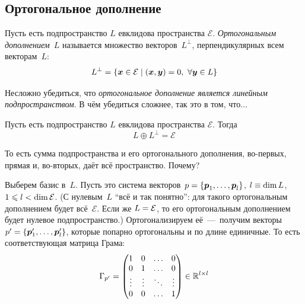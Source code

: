 \documentclass[a4paper,12pt]{article}
\begin{document}
  
  \subsection{Ортогональное дополнение}
  
  \begin{definition}
    Пусть есть подпространство $L$ евклидова пространства $\mathcal E$.
    \emph{Ортогональным дополнением}~$L$ называется множество векторов~$L^{\perp}$, перпендикулярных всем векторам~$L$:
    \[
      L^{\perp} = \{\boldsymbol x \in \mathcal E \mid (\boldsymbol x, \boldsymbol y) = 0,\ \forall \boldsymbol y \in L\}
    \]
  \end{definition}
  
  Несложно убедиться, что \emph{ортогональное дополнение является линейным подпространством}.
  В чём убедиться сложнее, так это в том, что...
  
  \begin{proposition}
    Пусть есть подпространство $L$ евклидова пространства $\mathcal E$.
    Тогда
    \[
      L \oplus L^{\perp} = \mathcal E
    \]
  \end{proposition}
  
  То есть сумма подпространства и его ортогонального дополнения, во-первых, прямая и, во-вторых, даёт всё пространство.
  Почему?
  
  Выберем базис в~$L$.
  Пусть это система векторов~$p \hm= \{\bds p_1, \ldots, \bds p_l\}$, $l \hm\equiv \dim L$, $1 \hm\leq l \hm< \dim \mathcal E$.
  (С нулевым~$L$ ``всё и так понятно'': для такого ортогональным дополнением будет всё~$\mathcal E$.
  Если же $L \hm= \mathcal E$, то его ортогональным дополнением будет нулевое подпространство.)
  Ортогонализируем её~---~получим векторы $p' \hm= \{\bds p_1', \ldots, \bds p_l'\}$, которые попарно ортогональны и по длине единичные.
  То есть соответствующая матрица Грама:
  \[
    \Gamma_{p'} = \begin{pmatrix}
      1      & 0      & \ldots & 0\\
      0      & 1      & \ldots & 0\\
      \vdots & \vdots & \ddots & \vdots\\
      0      & 0      & \ldots & 1
    \end{pmatrix} \in \operatorname{\mathbb R}^{l \times l}
  \]
  
\end{document}
